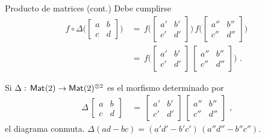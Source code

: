 \begin{frame}{Producto de matrices (cont.)}
	Debe cumplirse
	\begin{align*}
		f\circ\Delta\Big(
			\begin{bmatrix} a & b \\ c & d \end{bmatrix}
				\Big) & \,=\,
			f\Big(\begin{bmatrix} a' & b' \\ c' & d' \end{bmatrix}
				\Big)\,f\Big(
				\begin{bmatrix}
					a'' & b'' \\ c'' & d''
				\end{bmatrix}
				\Big) \\
		& \,=\, f\Big(\begin{bmatrix} a' & b' \\ c' & d' \end{bmatrix}
			\,\begin{bmatrix} a'' & b'' \\ c'' & d'' \end{bmatrix}
			\Big)
		\text{ .}
	\end{align*}
	\begin{propoProductoDeMatrices}\label{propo:productodematrices}
		Si $\Delta:\,\mathsf{Mat}_{}(2)\rightarrow\mathsf{Mat}_{}(2)^{\otimes 2}$ es el
		morfismo determinado por
		\begin{align*}
			\Delta\,\begin{bmatrix} a & b \\ c & d \end{bmatrix}
				& \,=\,
				\begin{bmatrix}
					a' & b' \\ c' & d'
				\end{bmatrix}\,
				\begin{bmatrix}
					a'' & b'' \\ c'' & d''
				\end{bmatrix}
			\text{ ,}
		\end{align*}
		el diagrama conmuta.
		\begin{math}
			\Delta(ad-bc)=(a'd'-b'c')\,(a''d''-b''c'')
		\end{math}.
	\end{propoProductoDeMatrices}
\end{frame}


